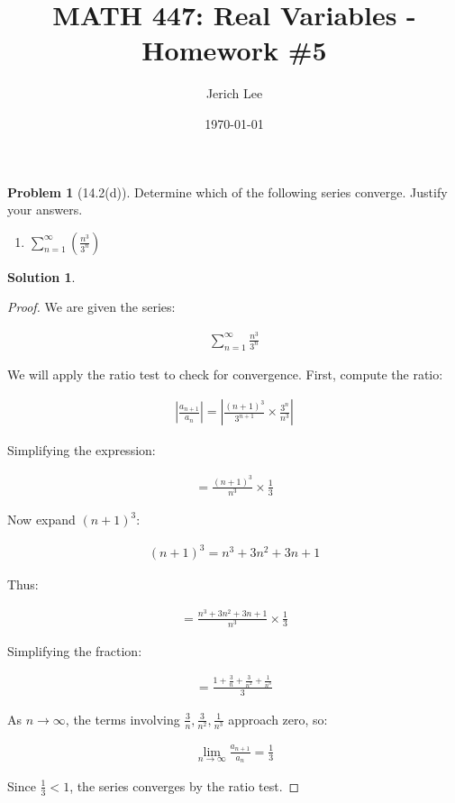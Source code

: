 \documentclass[12pt]{article}
\title{MATH 447: Real Variables - Homework \#5}
\author{Jerich Lee}
\date{\today}
\theoremstyle{definition} %
\newtheorem{solution}{Solution}
\newtheorem{problem}{Problem}
\theoremstyle{plain} %
\begin{document}
\maketitle
\begin{problem}[14.2(d)]
   Determine which of the following series converge. Justify your answers.
   \begin{enumerate}
    \item $\sum_{n=1}^{\infty} (\frac{n^{3}}{3^{n} })$ 
   \end{enumerate} 
\end{problem}
\begin{solution}
   \begin{proof}
      We are given the series:

\begin{align}
\sum_{n=1}^{\infty} \frac{n^3}{3^n}
\end{align}

We will apply the ratio test to check for convergence. First, compute the ratio:

\begin{align}
\left| \frac{a_{n+1}}{a_n} \right| = \left| \frac{(n+1)^3}{3^{n+1}} \times \frac{3^n}{n^3} \right|
\end{align}

Simplifying the expression:

\begin{align}
= \frac{(n+1)^3}{n^3} \times \frac{1}{3}
\end{align}

Now expand $(n+1)^3$:

\begin{align}
(n+1)^3 = n^3 + 3n^2 + 3n + 1
\end{align}

Thus:

\begin{align}
= \frac{n^3 + 3n^2 + 3n + 1}{n^3} \times \frac{1}{3}
\end{align}

Simplifying the fraction:

\begin{align}
= \frac{1 + \frac{3}{n} + \frac{3}{n^2} + \frac{1}{n^3}}{3}
\end{align}

As $ n \to \infty $, the terms involving $ \frac{3}{n}, \frac{3}{n^2}, \frac{1}{n^3} $ approach zero, so:

\begin{align}
\lim_{n \to \infty} \frac{a_{n+1}}{a_n} = \frac{1}{3}
\end{align}

Since $ \frac{1}{3} < 1 $, the series converges by the ratio test.




   \end{proof}

\end{solution}
\end{document}
